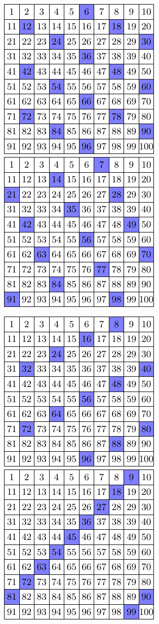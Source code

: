 \documentclass[11pt,a4paper,english]{article}
\begin{document}
\begin{center}
	\includegraphics{6} \qquad \qquad
	\includegraphics{7}
\end{center}
\begin{center}
	\includegraphics{8} \qquad \qquad
	\includegraphics{9}
\end{center}
\end{document}
